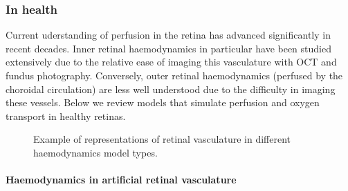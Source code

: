\documentclass{article}
\begin{document}
\subsubsection{In health}

Current uderstanding of perfusion in the retina has advanced significantly in recent decades.
Inner retinal haemodynamics in particular have been studied extensively due to the relative ease of imaging this vasculature with OCT and fundus photography.
Conversely, outer retinal haemodynamics (perfused by the choroidal circulation) are less well understood due to the difficulty in imaging these vessels.
Below we review models that simulate perfusion and oxygen transport in healthy retinas.

\begin{figure}[t!]
  \centering
  \caption{Example of representations of retinal vasculature in different haemodynamics model types.}
  \label{fig:HaemodynamicModels}
\end{figure}

\paragraph*{Haemodynamics in artificial retinal vasculature}
\end{document}
